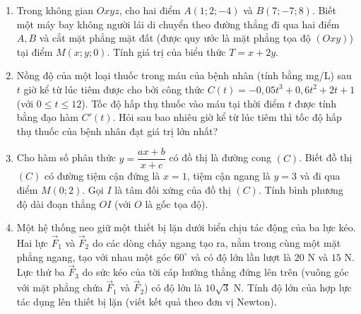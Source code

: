 \documentclass[12pt]{article}
\begin{document}
	\begin{enumerate}[label=\textbf{Câu \arabic*.}, leftmargin=*]
		
		\item Trong không gian $Oxyz$, cho hai điểm $A(1; 2; -4)$ và $B(7; -7; 8)$. Biết một máy bay không người lái di chuyển theo đường thẳng đi qua hai điểm $A, B$ và cắt mặt phẳng mặt đất (được quy ước là mặt phẳng tọa độ $(Oxy)$) tại điểm $M(x; y; 0)$. Tính giá trị của biểu thức $T = x + 2y$.
		\vspace{4mm}
		
		\item Nồng độ của một loại thuốc trong máu của bệnh nhân (tính bằng mg/L) sau $t$ giờ kể từ lúc tiêm được cho bởi công thức $C(t) = -0,05t^3 + 0,6t^2 + 2t + 1$ (với $0 \le t \le 12$). Tốc độ hấp thụ thuốc vào máu tại thời điểm $t$ được tính bằng đạo hàm $C'(t)$. Hỏi sau bao nhiêu giờ kể từ lúc tiêm thì tốc độ hấp thụ thuốc của bệnh nhân đạt giá trị lớn nhất?
		\vspace{4mm}
		
		\item Cho hàm số phân thức $y = \dfrac{ax+b}{x+c}$ có đồ thị là đường cong $(C)$. Biết đồ thị $(C)$ có đường tiệm cận đứng là $x = 1$, tiệm cận ngang là $y = 3$ và đi qua điểm $M(0; 2)$. Gọi $I$ là tâm đối xứng của đồ thị $(C)$. Tính bình phương độ dài đoạn thẳng $OI$ (với $O$ là gốc tọa độ).
		\vspace{4mm}
		
		\item Một hệ thống neo giữ một thiết bị lặn dưới biển chịu tác động của ba lực kéo. Hai lực $\vec{F}_1$ và $\vec{F}_2$ do các dòng chảy ngang tạo ra, nằm trong cùng một mặt phẳng ngang, tạo với nhau một góc $60^\circ$ và có độ lớn lần lượt là $20$ N và $15$ N. Lực thứ ba $\vec{F}_3$ do sức kéo của tời cáp hướng thẳng đứng lên trên (vuông góc với mặt phẳng chứa $\vec{F}_1$ và $\vec{F}_2$) có độ lớn là $10\sqrt{3}$ N. Tính độ lớn của hợp lực tác dụng lên thiết bị lặn (viết kết quả theo đơn vị Newton).
		
	\end{enumerate}
	
\end{document}
